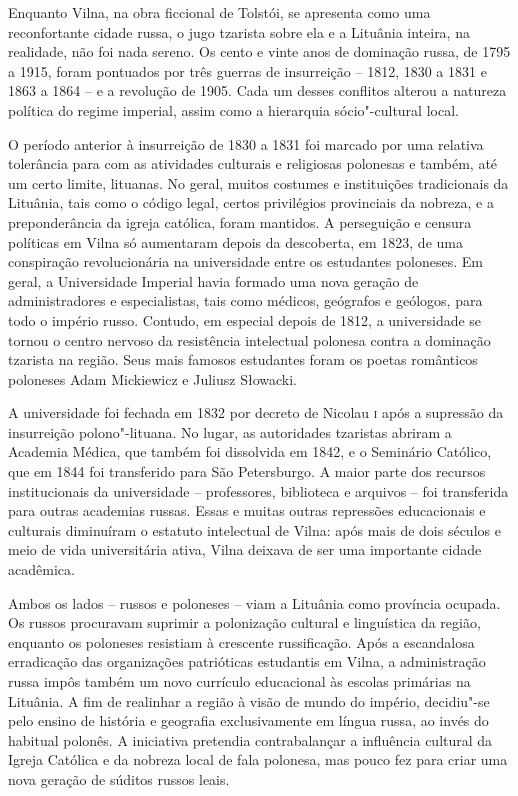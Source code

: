 Enquanto Vilna, na obra ficcional de Tolstói, se apresenta como uma
reconfortante cidade russa, o jugo tzarista sobre ela e a Lituânia
inteira, na realidade, não foi nada sereno. Os cento e vinte anos de
dominação russa, de 1795 a 1915, foram pontuados por três guerras de
insurreição -- 1812, 1830 a 1831 e 1863 a 1864 -- e a revolução de 1905. Cada
um desses conflitos alterou a natureza política do regime imperial,
assim como a hierarquia sócio"-cultural local.

O período anterior à insurreição de 1830 a 1831 foi marcado por uma relativa
tolerância para com as atividades culturais e religiosas polonesas e
também, até um certo limite, lituanas. No geral, muitos costumes e
instituições tradicionais da Lituânia, tais como o código legal, certos
privilégios provinciais da nobreza, e a preponderância da igreja
católica, foram mantidos. A perseguição e censura políticas em Vilna só
aumentaram depois da descoberta, em 1823, de uma conspiração
revolucionária na universidade entre os estudantes poloneses. Em geral,
a Universidade Imperial havia formado uma nova geração de
administradores e especialistas, tais como médicos, geógrafos e
geólogos, para todo o império russo. Contudo, em especial depois de
1812, a universidade se tornou o centro nervoso da resistência
intelectual polonesa contra a dominação tzarista na região. Seus mais
famosos estudantes foram os poetas românticos poloneses Adam Mickiewicz
e Juliusz Słowacki.

A universidade foi fechada em 1832 por decreto de Nicolau \textsc{i} após a
supressão da insurreição polono"-lituana. No lugar, as autoridades
tzaristas abriram a Academia Médica, que também foi dissolvida em 1842,
e o Seminário Católico, que em 1844 foi transferido para São
Petersburgo. A maior parte dos recursos institucionais da universidade --
professores, biblioteca e arquivos -- foi transferida para outras
academias russas. Essas e muitas outras repressões educacionais e
culturais diminuíram o estatuto intelectual de Vilna: após mais de dois
séculos e meio de vida universitária ativa, Vilna deixava de ser uma
importante cidade acadêmica.

Ambos os lados -- russos e poloneses -- viam a Lituânia como província
ocupada. Os russos procuravam suprimir a polonização cultural e
linguística da região, enquanto os poloneses resistiam à crescente
russificação. Após a escandalosa erradicação das organizações
patrióticas estudantis em Vilna, a administração russa impôs também um
novo currículo educacional às escolas primárias na Lituânia. A fim de
realinhar a região à visão de mundo do império, decidiu"-se pelo ensino
de história e geografia exclusivamente em língua russa, ao invés do
habitual polonês. A iniciativa pretendia contrabalançar a influência
cultural da Igreja Católica e da nobreza local de fala polonesa, mas
pouco fez para criar uma nova geração de súditos russos leais.

